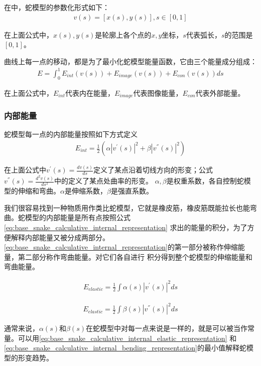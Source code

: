 在\cite{kass1988snakes}中，蛇模型的参数化形式如下：
\begin{align}\label{eq:base_snake_parameter_representation}
	v(s) = [x(s),y(s)],s \in [0,1]
\end{align}

在上面公式中，$x(s),y(s)$是轮廓上各个点的$x,y$坐标，$s$代表弧长，$s$的范围是$[0,1]$。

曲线上每一点的移动，都是为了最小化蛇模型能量函数，它由三个能量成分组成：
\begin{align}\label{eq:base_snake_calculative_representation}
	E = \int_0^1E_{int}(v(s))+E_{image}(v(s))+E_{con}(v(s)) ds
\end{align}

在上面公式中，$E_{int}$代表内在能量，$E_{image}$代表图像能量，$E_{con}$代表外部能量。

\subsubsection{内部能量}
蛇模型每一点的内部能量按照如下方式定义
\begin{align}\label{eq:base_snake_calculative_internal_representation}
	E_{int} = \frac{1}{2}(\alpha|v^{'}(s)|^{2}+\beta|v^{''}(s)|^{2})
\end{align}

在上面公式中$v^{'}(s)=\frac{dv(s)}{ds}$定义了某点沿着切线方向的形变；公式$v^{''}(s)=\frac{d^{2}v(s)}{ds^{2}}$中的定义了某点处曲率的形变。
$\alpha,\beta$是权重系数，各自控制蛇模型的伸缩和弯曲。$\alpha$是伸缩系数，$\beta$是强直系数。


我们很容易找到一种物质用作类比蛇模型，它就是橡皮筋，橡皮筋既能拉长也能弯曲。蛇模型的内部能量是所有点按照公式\eqref{eq:base_snake_calculative_internal_representation}
求出的能量的积分，为了方便解释内部能量又被分成两部分。\eqref{eq:base_snake_calculative_internal_representation}的第一部分被称作伸缩能量，第二部分称作弯曲能量。对它们各自进行
积分得到整个蛇模型的伸缩能量和弯曲能量。

\begin{align}\label{eq:base_snake_calculative_internal_elastic_representation}
	E_{elastic} = \frac{1}{2}\int\alpha(s)|v^{'}(s)|^{2}ds
\end{align}

\begin{align}\label{eq:base_snake_calculative_internal_bending_representation}
	E_{elastic} = \frac{1}{2}\int\beta(s)|v^{''}(s)|^{2}ds
\end{align}

通常来说，$\alpha(s)$和$\beta(s)$在蛇模型中对每一点来说是一样的，就是可以被当作常量。可以用\eqref{eq:base_snake_calculative_internal_elastic_representation}
和\eqref{eq:base_snake_calculative_internal_bending_representation}的最小值解释蛇模型的形变趋势。

